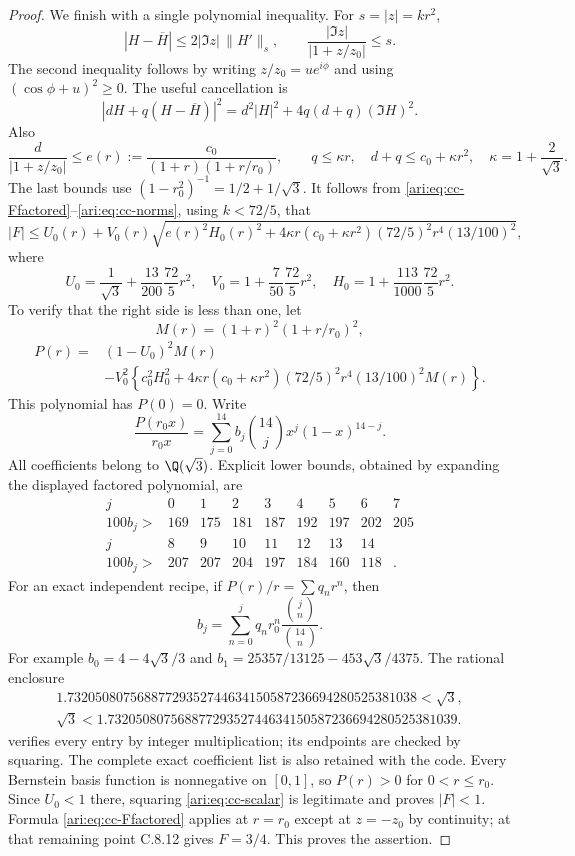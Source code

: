 \begin{proof}
We finish with a single polynomial inequality. For $s=|z|=kr^2$,
\[
 |H-\overline H|\le2|\Im z|\,\|H'\|_s,\qquad
 \frac{|\Im z|}{|1+z/z_0|}\le s.
\]
The second inequality follows by writing $z/z_0=ue^{i\phi}$
and using $(\cos\phi+u)^2\ge0$. The useful cancellation is
\[
 |dH+q(H-\overline H)|^2
      =d^2|H|^2+4q(d+q)(\Im H)^2.
\]
Also
\[
 \frac d{|1+z/z_0|}\le
 e(r):=\frac{c_0}{(1+r)(1+r/r_0)},\qquad
 q\le\kappa r,\quad d+q\le c_0+\kappa r^2,
 \quad\kappa=1+\frac2{\sqrt3}.
\]
The last bounds use $(1-r_0^2)^{-1}=1/2+1/\sqrt3$.
It follows from \eqref{ari:eq:cc-Ffactored}--\eqref{ari:eq:cc-norms},
using $k<72/5$, that
\begin{equation}\label{ari:eq:cc-scalar}
 |F|\le U_0(r)+V_0(r)
 \sqrt{e(r)^2H_0(r)^2+
       4\kappa r(c_0+\kappa r^2)(72/5)^2r^4(13/100)^2},
\end{equation}
where
\[
 U_0=\frac1{\sqrt3}+\frac{13}{200}\frac{72}{5}r^2,
 \quad V_0=1+\frac7{50}\frac{72}{5}r^2,
 \quad H_0=1+\frac{113}{1000}\frac{72}{5}r^2.
\]
To verify that the right side is less than one, let
\[
 M(r)=(1+r)^2(1+r/r_0)^2,
\]
\begin{equation}\label{ari:eq:cc-P}
 \begin{aligned}
 P(r)={}&(1-U_0)^2M(r)\\
 &-V_0^2\left\{c_0^2H_0^2+
 4\kappa r(c_0+\kappa r^2)(72/5)^2r^4(13/100)^2M(r)\right\}.
 \end{aligned}
\end{equation}
This polynomial has $P(0)=0$. Write
\[
 \frac{P(r_0x)}{r_0x}
     =\sum_{j=0}^{14}b_j\binom{14}{j}x^j(1-x)^{14-j}.
\]
All coefficients belong to $\Q(\sqrt3)$. Explicit lower bounds,
obtained by expanding the displayed factored polynomial, are
\[
 \begin{array}{c|rrrrrrrr}
 j&0&1&2&3&4&5&6&7\\ \hline
 100b_j>&169&175&181&187&192&197&202&205\\[2pt]
 j&8&9&10&11&12&13&14&\\ \hline
 100b_j>&207&207&204&197&184&160&118&.
 \end{array}
\]
For an exact independent recipe, if $P(r)/r=\sum q_nr^n$,
then
\[
 b_j=\sum_{n=0}^j q_nr_0^n
                  \frac{\binom jn}{\binom{14}n}.
\]
For example $b_0=4-4\sqrt3/3$ and
$b_1=25357/13125-453\sqrt3/4375$. The rational enclosure
\[
 \begin{gathered}
 1.73205080756887729352744634150587236694280525381038<\sqrt3,\\
 \sqrt3<1.73205080756887729352744634150587236694280525381039.
 \end{gathered}
\]
verifies every entry by integer multiplication; its endpoints
are checked by squaring. The complete exact coefficient list is
also retained with the code. Every Bernstein basis function is
nonnegative on $[0,1]$, so $P(r)>0$ for $0<r\le r_0$.
Since $U_0<1$ there, squaring \eqref{ari:eq:cc-scalar} is legitimate
and proves $|F|<1$. Formula \eqref{ari:eq:cc-Ffactored} applies
at $r=r_0$ except at $z=-z_0$ by continuity; at that remaining
point C.8.12 gives $F=3/4$. This proves the assertion.
\end{proof}

